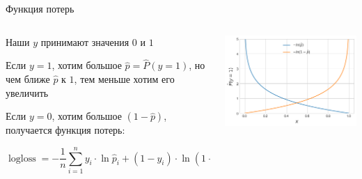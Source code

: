 \documentclass[notes,12pt, aspectratio=169]{beamer}
\newenvironment{wideitemize}{\itemize\addtolength{\itemsep}{10pt}}{\enditemize}
\DeclareMathOperator{\logloss}{logloss}
\begin{document}
\begin{frame}{Функция потерь}
	\begin{columns}[T] %
	\begin{column}{.49\textwidth}
		\begin{wideitemize}
			\item Наши $y$ принимают значения $0$ и $1$ 
			\item Если $y = 1$, хотим большое $\hat p = \hat P(y = 1)$, но чем ближе $\hat p$ к $1$, тем меньше хотим его увеличить 
			\item Если $y = 0$, хотим большое $(1 - \hat p)$, получается функция потерь: 
			
			$$
			\logloss = - \frac{1}{n} \sum_{i=1}^n y_i \cdot \ln \hat p_i + (1 - y_i) \cdot \ln (1 - \hat p_i)
			$$
		\end{wideitemize}	
	\end{column}%
	\hfill%
	\begin{column}{.49\textwidth}
		\begin{center}
			\includegraphics[width= 0.95\linewidth]{log_loss_05.png}
		\end{center}
	\end{column}%
\end{columns}
\end{frame}
\end{document}
